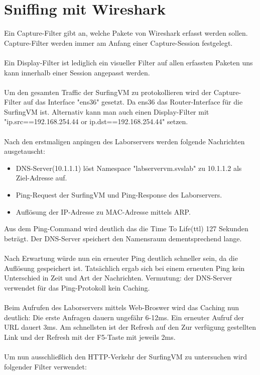 \documentclass[12pt]{article}
\theoremstyle{plain}
\begin{document}
\section{Sniffing mit Wireshark}
Ein Capture-Filter gibt an, welche Pakete von Wireshark erfasst werden sollen. Capture-Filter werden immer am Anfang einer Capture-Session festgelegt. \\ \\
Ein Display-Filter ist lediglich ein visueller Filter auf allen erfassten Paketen uns kann innerhalb einer Session angepasst werden.
\\\\
Um den gesamten Traffic der SurfingVM zu protokollieren wird der Capture-Filter auf das Interface "ens36" gesetzt. Da ens36 das Router-Interface für die SurfingVM ist. Alternativ kann man auch einen Display-Filter mit "ip.src==192.168.254.44 or ip.dst==192.168.254.44" setzen. \\ \\
Nach den erstmaligen anpingen des Laborservers werden folgende Nachrichten ausgetauscht: 
\begin{itemize}
\item DNS-Server(10.1.1.1) löst Namespace "labservervm.svslab" zu 10.1.1.2 als Ziel-Adresse auf.
\item Ping-Request der SurfingVM und Ping-Response des Laborservers.
\item Auflösung der IP-Adresse zu MAC-Adresse mittels ARP.
\end{itemize}
Aus dem Ping-Command wird deutlich das die Time To Life(ttl) 127 Sekunden beträgt.
Der DNS-Server speichert den Namensraum dementsprechend lange. \\ \\
Nach Erwartung würde nun ein erneuter Ping deutlich schneller sein, da die Auflösung gespeichert ist. Tatsächlich ergab sich bei einem erneuten Ping kein Unterschied in Zeit und Art der Nachrichten. Vermutung: der DNS-Server verwendet für das Ping-Protokoll kein Caching. \\ \\
Beim Aufrufen des Laborservers mittels Web-Broswer wird das Caching nun deutlich:
Die erste Anfragen dauern ungefähr 6-12ms. Ein erneuter Aufruf der URL dauert 3ms. Am schnellsten ist der Refresh auf den Zur verfügung gestellten Link und der Refresh mit der F5-Taste mit jeweils 2ms.
\\\\
Um nun ausschließlich den HTTP-Verkehr der SurfingVM zu untersuchen wird folgender Filter verwendet: \\
\end{document}
